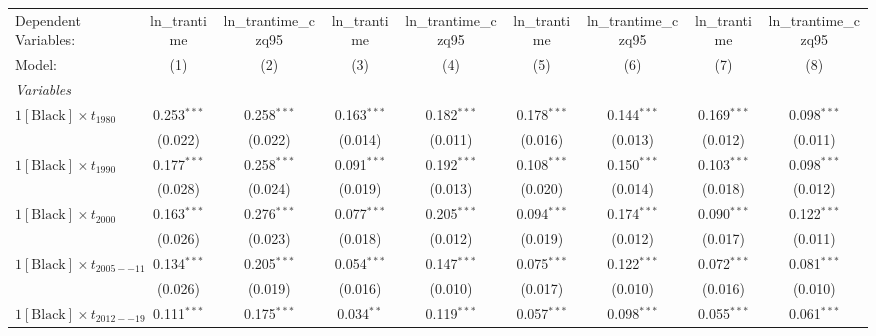 
\begingroup
\centering
\begin{tabular}{lcccccccc}
   \tabularnewline \midrule \midrule
   Dependent Variables:                    & ln\_trantime  & ln\_trantime\_czq95   & ln\_trantime  & ln\_trantime\_czq95   & ln\_trantime  & ln\_trantime\_czq95   & ln\_trantime  & ln\_trantime\_czq95\\    
   Model:                                  & (1)           & (2)                   & (3)           & (4)                   & (5)           & (6)                   & (7)           & (8)\\  
   \midrule
   \emph{Variables}\\
   $1[\text{Black}] \times t_{1980}$       & 0.253$^{***}$ & 0.258$^{***}$         & 0.163$^{***}$ & 0.182$^{***}$         & 0.178$^{***}$ & 0.144$^{***}$         & 0.169$^{***}$ & 0.098$^{***}$\\   
                                           & (0.022)       & (0.022)               & (0.014)       & (0.011)               & (0.016)       & (0.013)               & (0.012)       & (0.011)\\   
   $1[\text{Black}] \times t_{1990}$       & 0.177$^{***}$ & 0.258$^{***}$         & 0.091$^{***}$ & 0.192$^{***}$         & 0.108$^{***}$ & 0.150$^{***}$         & 0.103$^{***}$ & 0.098$^{***}$\\   
                                           & (0.028)       & (0.024)               & (0.019)       & (0.013)               & (0.020)       & (0.014)               & (0.018)       & (0.012)\\   
   $1[\text{Black}] \times t_{2000}$       & 0.163$^{***}$ & 0.276$^{***}$         & 0.077$^{***}$ & 0.205$^{***}$         & 0.094$^{***}$ & 0.174$^{***}$         & 0.090$^{***}$ & 0.122$^{***}$\\   
                                           & (0.026)       & (0.023)               & (0.018)       & (0.012)               & (0.019)       & (0.012)               & (0.017)       & (0.011)\\   
   $1[\text{Black}] \times t_{2005--11}$   & 0.134$^{***}$ & 0.205$^{***}$         & 0.054$^{***}$ & 0.147$^{***}$         & 0.075$^{***}$ & 0.122$^{***}$         & 0.072$^{***}$ & 0.081$^{***}$\\   
                                           & (0.026)       & (0.019)               & (0.016)       & (0.010)               & (0.017)       & (0.010)               & (0.016)       & (0.010)\\   
   $1[\text{Black}] \times t_{2012--19}$   & 0.111$^{***}$ & 0.175$^{***}$         & 0.034$^{**}$  & 0.119$^{***}$         & 0.057$^{***}$ & 0.098$^{***}$         & 0.055$^{***}$ & 0.061$^{***}$\\   

\end{tabular}
